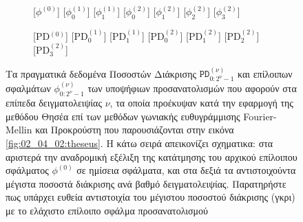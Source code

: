 \begin{figure}
  \begin{subfigure}{0.5\linewidth}
    \begin{onion}{1.0cm}
      [$\phi^{(0)}$]
      [$\phi_0^{(1)}$]
      [$\phi_1^{(1)}$]
      [$\phi_0^{(2)}$]
      [$\phi_1^{(2)}$]
      [$\phi_2^{(2)}$]
      [$\phi_3^{(2)}$]
    \end{onion}
  \end{subfigure}%
  \begin{subfigure}{0.5\linewidth}\vspace{-0.1cm}
    \begin{onion}{1.0cm}
      [PD$^{(0)}$]
      [PD$_0^{(1)}$]
      [PD$_1^{(1)}$]
      [PD$_0^{(2)}$]
      [PD$_1^{(2)}$]
      [PD$_2^{(2)}$]
      [PD$_3^{(2)}$]
    \end{onion}
  \end{subfigure}
\vspace{-1cm}
\caption{\small Τα πραγματικά δεδομένα Ποσοστών Διάκρισης
         $\texttt{PD}^{(\nu)}_{0:2^{\nu}-1}$ και επίλοιπων σφαλμάτων
         $\phi^{(\nu)}_{0:2^{\nu}-1}$ των υποψήφιων προσανατολισμών που αφορούν
         στα επίπεδα δειγματολειψίας $\nu$, τα οποία προέκυψαν κατά την εφαρμογή
         της μεθόδου Θησέα επί των μεθόδων γωνιακής ευθυγράμμισης
         Fourier-Mellin και Προκρούστη που παρουσιάζονται στην εικόνα
         \ref{fig:02_04_02:theseus}. Η κάτω σειρά απεικονίζει σχηματικα: στα
         αριστερά την αναδρομική εξέλιξη της κατάτμησης του αρχικού επίλοιπου
         σφάλματος $\phi^{(0)}$ σε ημίσεια σφάλματα, και στα δεξιά τα
         αντιστοιχούντα μέγιστα ποσοστά διάκρισης ανά βαθμό δειγματολειψίας.
         Παρατηρήστε πως υπάρχει ευθεία αντιστοιχία του μέγιστου ποσοστού
         διάκρισης (γκρι) με το ελάχιστο επίλοιπο σφάλμα προσανατολισμού}
\label{fig:02_04_02:theseus_pd}
\end{figure}
